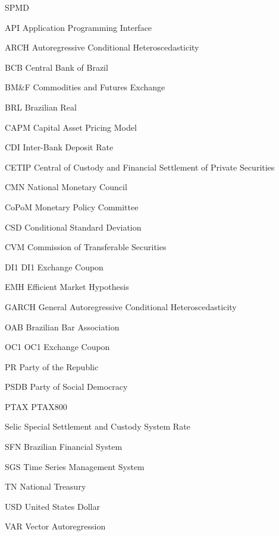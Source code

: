 \documentclass[cic,tc, english]{iiufrgs}
\begin{document}
\begin{listofabbrv}{SPMD}
    
    \item[API] Application Programming Interface
    \item[ARCH] Autoregressive Conditional Heteroscedasticity
    \item[BCB] Central Bank of Brazil
    \item[BM\&F] Commodities and Futures Exchange
    \item[BRL] Brazilian Real
    \item[CAPM] Capital Asset Pricing Model
    \item[CDI] Inter-Bank Deposit Rate
    \item[CETIP] Central of Custody and Financial Settlement of Private Securities
    \item[CMN] National Monetary Council
    \item[CoPoM] Monetary Policy Committee
    \item[CSD] Conditional Standard Deviation
    \item[CVM] Commission of Transferable Securities
    \item[DI1] DI1 Exchange Coupon
    \item[EMH] Efficient Market Hypothesis
    \item[GARCH] General Autoregressive Conditional Heteroscedasticity
    \item[OAB] Brazilian Bar Association
    \item[OC1] OC1 Exchange Coupon
    \item[PR] Party of the Republic
    \item[PSDB] Party of Social Democracy
    \item[PTAX] PTAX800
    \item[Selic] Special Settlement and Custody System Rate
    \item[SFN] Brazilian Financial System
    \item[SGS] Time Series Management System
    \item[TN] National Treasury
    \item[USD] United States Dollar
    \item[VAR] Vector Autoregression

\end{listofabbrv}

\tableofcontents

\end{document}
